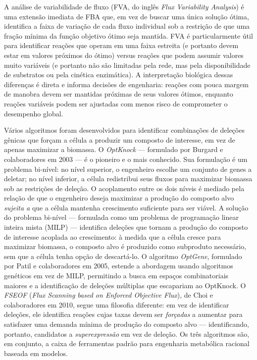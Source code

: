 A análise de variabilidade de fluxo (FVA, do inglês \emph{Flux Variability Analysis}) é uma extensão imediata de FBA que, em vez de buscar uma única solução ótima, identifica a faixa de variação de cada fluxo individual sob a restrição de que uma fração mínima da função objetivo ótimo seja mantida. FVA é particularmente útil para identificar reações que operam em uma faixa estreita (e portanto devem estar em valores próximos do ótimo) versus reações que podem assumir valores muito variáveis (e portanto não são limitadas pela rede, mas pela disponibilidade de substratos ou pela cinética enzimática). A interpretação biológica dessas diferenças é direta e informa decisões de engenharia: reações com pouca margem de manobra devem ser mantidas próximas de seus valores ótimos, enquanto reações variáveis podem ser ajustadas com menos risco de comprometer o desempenho global.

Vários algoritmos foram desenvolvidos para identificar combinações de deleções gênicas que forçam a célula a produzir um composto de interesse, em vez de apenas maximizar a biomassa. O \emph{OptKnock} --- formulado por Burgard e colaboradores em 2003 --- é o pioneiro e o mais conhecido. Sua formulação é um problema bi-nível: no nível superior, o engenheiro escolhe um conjunto de genes a deletar; no nível inferior, a célula redistribui seus fluxos para maximizar biomassa sob as restrições de deleção. O acoplamento entre os dois níveis é mediado pela relação de que o engenheiro deseja maximizar a produção do composto alvo \emph{sujeita a} que a célula mantenha crescimento suficiente para ser viável. A solução do problema bi-nível --- formulada como um problema de programação linear inteira mista (MILP) --- identifica deleções que tornam a produção do composto de interesse acoplada ao crescimento: à medida que a célula cresce para maximizar biomassa, o composto alvo é produzido como subproduto necessário, sem que a célula tenha opção de descartá-lo. O algoritmo \emph{OptGene}, formulado por Patil e colaboradores em 2005, estende a abordagem usando algoritmos genéticos em vez de MILP, permitindo a busca em espaços combinatoriais maiores e a identificação de deleções múltiplas que escapariam ao OptKnock. O \emph{FSEOF} (\emph{Flux Scanning based on Enforced Objective Flux}), de Choi e colaboradores em 2010, segue uma filosofia diferente: em vez de identificar deleções, ele identifica reações cujas taxas devem ser \emph{forçadas} a aumentar para satisfazer uma demanda mínima de produção do composto alvo --- identificando, portanto, candidatos a \emph{superexpressão} em vez de deleção. Os três algoritmos são, em conjunto, a caixa de ferramentas padrão para engenharia metabólica racional baseada em modelos.

